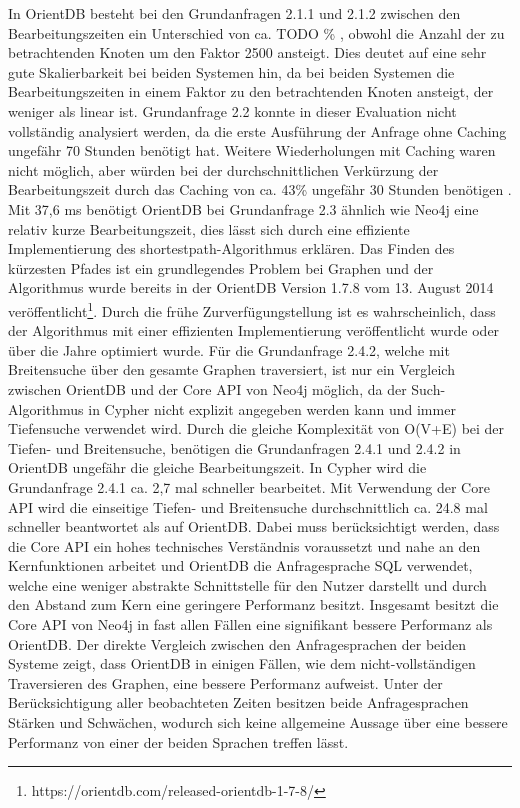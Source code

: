  In OrientDB besteht bei den Grundanfragen 2.1.1 und 2.1.2 zwischen den Bearbeitungszeiten ein Unterschied von ca. {\color{red}  TODO} \% , obwohl die Anzahl der zu betrachtenden  Knoten um den Faktor 2500 ansteigt. Dies deutet auf eine sehr gute Skalierbarkeit bei beiden Systemen hin, da bei beiden Systemen die Bearbeitungszeiten in einem Faktor zu den betrachtenden Knoten ansteigt, der weniger als linear ist. \newline  
 Grundanfrage 2.2 konnte in dieser Evaluation nicht vollständig analysiert werden, da die erste Ausführung der Anfrage ohne Caching ungefähr 70 Stunden benötigt hat. Weitere Wiederholungen mit Caching waren nicht möglich, aber würden bei der durchschnittlichen Verkürzung der Bearbeitungszeit durch das Caching von ca. 43\%  ungefähr 30 Stunden benötigen . \newline
Mit 37,6 ms benötigt OrientDB bei Grundanfrage 2.3 ähnlich wie Neo4j eine relativ kurze Bearbeitungszeit, dies lässt sich durch eine effiziente Implementierung des shortestpath-Algorithmus erklären. Das Finden des kürzesten Pfades ist ein grundlegendes Problem bei Graphen und der Algorithmus wurde bereits in der OrientDB Version 1.7.8 vom 13. August 2014 veröffentlicht\footnote{https://orientdb.com/released-orientdb-1-7-8/}. Durch die frühe Zurverfügungstellung ist es wahrscheinlich, dass der Algorithmus mit einer effizienten Implementierung veröffentlicht wurde oder über die Jahre optimiert wurde. \newline
Für die Grundanfrage 2.4.2, welche mit Breitensuche über den gesamte Graphen traversiert, ist nur ein Vergleich zwischen OrientDB und der Core API von Neo4j möglich, da der Such-Algorithmus in Cypher nicht explizit angegeben werden kann und immer Tiefensuche verwendet wird. Durch die gleiche Komplexität von O(V+E) bei der Tiefen- und Breitensuche, benötigen die Grundanfragen 2.4.1 und 2.4.2 in OrientDB ungefähr die gleiche Bearbeitungszeit. In Cypher wird die Grundanfrage 2.4.1 ca. 2,7 mal schneller bearbeitet. Mit Verwendung der Core API wird die einseitige Tiefen- und Breitensuche durchschnittlich ca. 24.8 mal schneller beantwortet als auf OrientDB. Dabei muss berücksichtigt werden, dass die Core API ein hohes technisches Verständnis voraussetzt und nahe an den Kernfunktionen arbeitet und OrientDB die Anfragesprache SQL verwendet, welche eine weniger abstrakte Schnittstelle für den Nutzer darstellt und durch den Abstand zum Kern eine geringere Performanz besitzt. \newline
Insgesamt besitzt die Core API von Neo4j in fast allen Fällen eine signifikant bessere Performanz als OrientDB. Der direkte Vergleich zwischen den Anfragesprachen der beiden Systeme zeigt, dass OrientDB in einigen Fällen, wie dem nicht-vollständigen Traversieren des Graphen, eine bessere Performanz aufweist. Unter der Berücksichtigung aller beobachteten Zeiten besitzen beide Anfragesprachen Stärken und Schwächen, wodurch sich keine allgemeine Aussage über eine bessere Performanz von einer der beiden Sprachen treffen lässt. 
